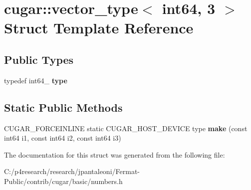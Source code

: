 \hypertarget{structcugar_1_1vector__type_3_01int64_00_013_01_4}{}\section{cugar\+:\+:vector\+\_\+type$<$ int64, 3 $>$ Struct Template Reference}
\label{structcugar_1_1vector__type_3_01int64_00_013_01_4}
\subsection*{Public Types}
\begin{DoxyCompactItemize}
\item 
\mbox{\label{structcugar_1_1vector__type_3_01int64_00_013_01_4_aee0e1626403b0948ec7421ef5300c86f}} 
typedef int64\+\_ {\bfseries type}
\end{DoxyCompactItemize}
\subsection*{Static Public Methods}
\begin{DoxyCompactItemize}
\item 
\mbox{\label{structcugar_1_1vector__type_3_01int64_00_013_01_4_ab16e27bef5062b3e0a5236224455d624}} 
C\+U\+G\+A\+R\+\_\+\+F\+O\+R\+C\+E\+I\+N\+L\+I\+NE static C\+U\+G\+A\+R\+\_\+\+H\+O\+S\+T\+\_\+\+D\+E\+V\+I\+CE type {\bfseries make} (const int64 i1, const int64 i2, const int64 i3)
\end{DoxyCompactItemize}


The documentation for this struct was generated from the following file\+:\begin{DoxyCompactItemize}
\item 
C\+:/p4research/research/jpantaleoni/\+Fermat-\/\+Public/contrib/cugar/basic/numbers.\+h\end{DoxyCompactItemize}
